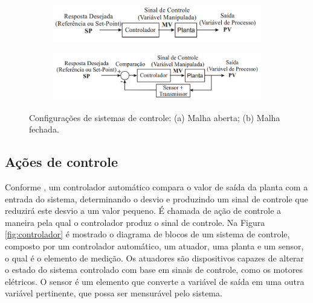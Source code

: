 \begin{figure}[h]
    \centering
    \captionsetup{width=0.8\textwidth,font=footnotesize,textfont=bf}
    \begin{subfigure}[b]{0.8\textwidth}
	\centering
        \includegraphics[width=\textwidth,height=\textheight,keepaspectratio]{figuras/MalhaAberta.png}
        \caption{\centering \label{fig:Malhaaberta}}
    \end{subfigure}
    
    \begin{subfigure}[b]{0.8\textwidth}
	\centering
        \includegraphics[width=\textwidth,height=\textheight,keepaspectratio]{figuras/MalhaFechada.png}
        \caption{\centering \label{fig:Malhafechada}}
    \end{subfigure}
    
    \caption{\label{fig:Malhas} Configurações de sistemas de controle: (a) Malha aberta; (b) Malha fechada.}
    \caption*{\cite{controle}}
\end{figure}


\subsection{Ações de controle}

Conforme , um controlador automático compara o valor de saída da planta com a entrada do sistema, 
determinando o desvio e produzindo um sinal de controle que reduzirá este desvio a um valor pequeno. É chamada de ação de controle a 
maneira pela qual o controlador produz o sinal de controle. Na Figura \ref{fig:controlador} é mostrado o diagrama de blocos 
de um sistema de controle, composto por um controlador automático, um atuador, uma planta e um sensor, o qual é 
o elemento de medição. Os atuadores são dispositivos capazes de alterar 
o estado do sistema controlado com base em sinais de controle, como os motores elétricos. O sensor é um elemento que 
converte a variável de saída em uma outra variável pertinente, que possa ser mensurável pelo sistema.

